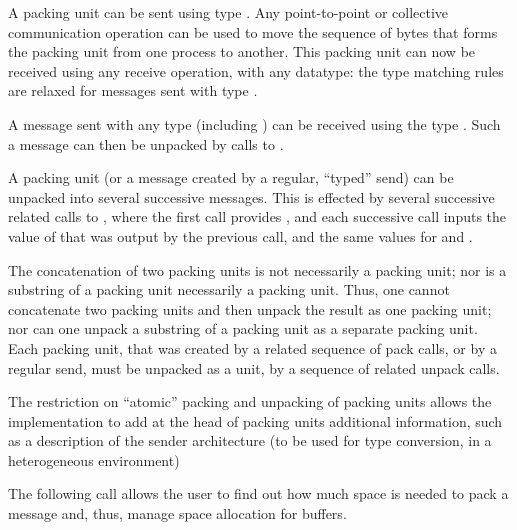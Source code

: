 A  packing unit can
be sent using type .  Any point-to-point
or collective communication operation can be used to move the sequence of bytes
that forms the packing unit from one process to another.  This packing unit
can now be
received using any receive operation, with any datatype:  the
type matching rules are relaxed for messages sent with type .

A message sent with any type (including ) can be
received using the type .  Such a message can then be
unpacked by calls to .

A packing unit (or a message created by a regular, ``typed'' send)
can be unpacked into several successive messages.  This is
effected by several successive related calls to , where
the first
call provides , and each successive call inputs the value
of  that was output by the previous call, and the same values
for  and .


The concatenation of two packing units is not necessarily a packing unit; nor is
a substring of a packing unit necessarily a packing unit.  Thus, one cannot
concatenate two packing units and then unpack the result as one packing
unit; nor can one unpack a substring of a packing unit as a separate
packing unit.  Each packing unit, that was created by a related
sequence of pack
calls, or by a regular send,
must be unpacked as a unit, by a sequence of related unpack calls.



\begin{rationale}
The restriction on ``atomic'' packing and unpacking of packing units allows
the implementation to add at the head of packing units additional
information, such as
a description of the sender architecture (to be used for type conversion, in a
heterogeneous environment)
\end{rationale}



The following call allows the user to find out how much space is
needed to pack a message and, thus, manage space allocation for
buffers.

